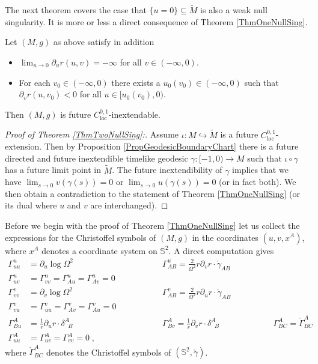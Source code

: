 \documentclass[reqno]{article}
\newcommand{\loc}{\mathrm{loc}}
\newcommand{\mg}{\mathring{\gamma}}
\begin{document}
The next theorem covers the case that $\{u = 0\} \subseteq \tilde{M}$ is also a weak null singularity. It is more or less a direct consequence of Theorem \ref{ThmOneNullSing}.
\begin{theorem} \label{ThmTwoNullSing}
Let $(M,g)$ as above satisfy in addition 
\begin{itemize}
\item $\lim_{u \to 0} \partial_u r(u,v) = -\infty$ for all $v \in (-\infty,0)$.\\[-15pt]
\item For each $v_0 \in (-\infty, 0) $ there exists a $ u_0(v_0) \in (-\infty, 0)$ such that $\partial_v r (u,v_0)<0$ for all $u \in [u_0(v_0),0)$.
\end{itemize}
Then $(M,g)$ is future $C^{0,1}_{\loc}$-inextendable.
\end{theorem}

\begin{proof}[Proof of Theorem \ref{ThmTwoNullSing}:]
Assume $\iota : M \hookrightarrow \tilde{M}$ is a future $C^{0,1}_{\loc}$-extension. Then by Proposition \ref{PropGeodesicBoundaryChart} there is a future directed and future inextendible timelike geodesic $\gamma : [-1,0) \to M$ such that $\iota \circ \gamma$ has a future limit point in $\tilde{M}$. The future inextendibility of $\gamma$ implies that we have $\lim_{s \to 0} v(\gamma(s)) = 0$ or $\lim_{s \to 0} u(\gamma(s)) = 0$ (or in fact both). We then obtain a contradiction to the statement of Theorem \ref{ThmOneNullSing} (or its dual where $u$ and $v$ are interchanged).
\end{proof}

Before we begin with the proof of Theorem \ref{ThmOneNullSing} let us collect the expressions for the Christoffel symbols of $(M,g)$ in the coordinates $(u,v, x^A)$, where $x^A$ denotes a coordinate system on $\mathbb{S}^2$. A direct computation gives
\begin{equation}
\label{EqChristoffelNullSing}
\begin{aligned}
\Gamma^u_{uu} &= \partial_u \log \Omega^2 \ \qquad \qquad \hspace{2cm} &&\Gamma^u_{AB} = \frac{2}{\Omega^2} r \partial_vr  \cdot \mg_{AB} \\
\Gamma^u_{uv} &= \Gamma^u_{vv} = \Gamma^u_{Au} = \Gamma^u_{Av} = 0 \\[5mm]
\Gamma^v_{vv} &= \partial_v \log \Omega^2 \qquad \quad &&\Gamma^v_{AB} = \frac{2}{\Omega^2} r \partial_ur  \cdot \mg_{AB} \\
\Gamma^v_{vu} &= \Gamma^v_{uu} = \Gamma^v_{Av} = \Gamma^v_{Au} = 0 \\[5mm]
\Gamma^A_{Bu} &= \frac{1}{r} \partial_u r \cdot \delta^A_{\; \; B} &&\Gamma^A_{Bv} = \frac{1}{r} \partial_v r \cdot \delta^A_{\; \; B} \qquad \qquad &&&\Gamma^A_{BC} = \mathring{\Gamma}^A_{BC} \\
\Gamma^A_{uu} &= \Gamma^A_{uv} = \Gamma^A_{vv} = 0 \;,
\end{aligned}
\end{equation}
where $\mathring{\Gamma}^A_{BC} $ denotes the Christoffel symbols of $(\mathbb{S}^2, \mg)$.
\end{document}
